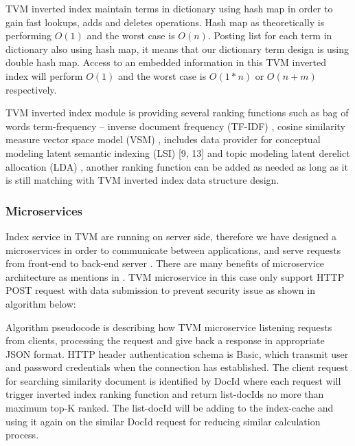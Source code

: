 TVM inverted index maintain terms in dictionary using hash map in order to gain fast lookups, adds and deletes operations. Hash map as theoretically is performing \(O(1)\) and the worst case is \(O(n)\). Posting list for each term in dictionary also using hash map, it means that our dictionary term design is using double hash map. Access to an embedded information in this TVM inverted index will perform \(O(1)\) and the worst case is \(O(1*n)\) or \(O(n + m)\) respectively.

TVM inverted index module is providing several ranking functions such as bag of words term-frequency -- inverse document frequency (TF-IDF) \cite{ManningRaghavanSchutze}, cosine similarity measure vector space model (VSM) \cite{SaltonBuckley}, includes data provider for conceptual modeling latent semantic indexing (LSI) [9, 13] and topic modeling latent derelict allocation (LDA) \cite{BleiNgJordan}, another ranking function can be added as needed as long as it is still matching with TVM inverted index data structure design.

\subsubsection{Microservices} Index service in TVM are running on server side, therefore we have designed a microservices in order to communicate between applications, and serve requests from front-end to back-end server \cite{AnggaiBlekanovSergeev2015}. There are many benefits of microservice architecture as mentions in \cite{Singleton,GuoWangZeng,Bakshi}. TVM microservice in this case only support HTTP POST request with data submission to prevent security issue as shown in algorithm below:

\begin{figure}[ht]
	\label{fig:algoQuery}
\end{figure}

Algorithm pseudocode is describing how TVM microservice listening requests from clients, processing the request and give back a response in appropriate JSON format. HTTP header authentication schema is Basic, which transmit user and password credentials when the connection has established. The client request for searching similarity document is identified by DocId where each request will trigger inverted index ranking function and return list-docIds no more than maximum top-K ranked. The list-docId will be adding to the index-cache and using it again on the similar DocId request for reducing similar calculation process.

